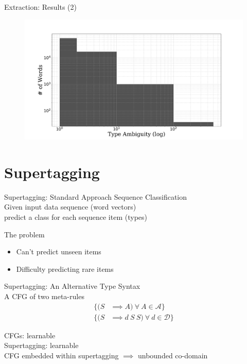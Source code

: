 \documentclass{beamer}
\begin{document}
{
\begin{frame}{Extraction: Results (2)}
	\begin{figure}
		\includegraphics[scale=0.24]{ambiguity.pdf}
	\end{figure}
\end{frame}
}

\section{Supertagging}

\begin{frame}{Supertagging: Standard Approach}
	\alert{Sequence Classification}\\
	\quad Given input data sequence (word vectors) \\
	\quad predict a class for each sequence item (types)
	\vfill
	
	\pause
	\alert{The problem}
	\begin{itemize}
		\item Can't predict unseen items
		\item Difficulty predicting rare items
	\end{itemize}
\end{frame}

\begin{frame}{Supertagging: An Alternative}
	\alert{Type Syntax}\\
	A CFG of two meta-rules
	\begin{align*}
	\{ (S & \implies A) \  \forall \ A \in \mathcal{A} \}\\
	\{(S & \implies d \ S \ S) \ \forall \ d \in \mathcal{D} \}
	\end{align*}
	
	\pause
	CFGs: learnable \\ 
	\pause
	Supertagging: learnable \\
	\pause
	CFG embedded within supertagging $\implies$ \alert{unbounded co-domain}
\end{frame}
\end{document}
